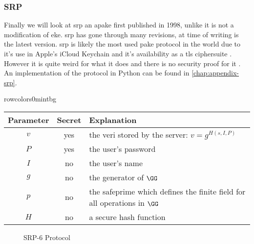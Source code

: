 \clearpage

\subsubsection{SRP}
Finally we will look at \gls{srp} an \gls{apake} first published in 1998, unlike  it is not a modification of \gls{eke}.
\gls{srp} has gone through many revisions, at time of writing  is the latest version.
\gls{srp} is likely the most used \gls{pake} protocol in the world due to it's use in Apple's iCloud Keychain \cite{apple-keychain-srp} and it's availability as a \gls{tls} ciphersuite \cite{tls-srp}.
However it is quite weird for what it does and there is no security proof for it \cite{srp-blog}. An implementation of the protocol in Python can be found in \cref{chap:appendix-srp}.

\begin{center}
  rowcolors{0}{}{mintbg}
  \begin{tabularx}{\linewidth}{ ccX }
    \toprule
    Parameter & Secret & Explanation \\
    \midrule
    $v$ & yes & the \gls{veri}\label{text:srp-verifier-generation} stored by the server: $v=g^{H(s,I,P)}$ \\
    $P$ & yes & the user's password \\
    $I$ & no & the user's name \\
    $g$ & no & the generator of $\GG$ \\
    $p$ & no & the \gls{safeprime} which defines the finite field for all operations in $\GG$ \\
    $H$ & no & a secure hash function \\
    \bottomrule
  \end{tabularx}
\end{center}

\begin{figure}[H]

  \caption{SRP-6 Protocol}
  \label{fig:srp}
\end{figure}

